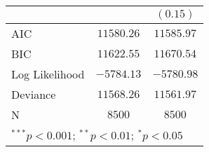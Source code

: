 \documentclass[12pt,letterpaper]{article}
\begin{document}
\begin{enumerate}
\begin{table}[h!]
\begin{adjustbox}{width=.65\textwidth}
\begin{tabular}{l c c}
			&               & $(0.15)$      \\
			\hline
			AIC                               & $11580.26$    & $11585.97$    \\
			BIC                               & $11622.55$    & $11670.54$    \\
			Log Likelihood                    & $-5784.13$    & $-5780.98$    \\
			Deviance                          & $11568.26$    & $11561.97$    \\
			N                        & $8500$        & $8500$        \\
			\hline
			\multicolumn{3}{l}{\scriptsize{$^{***}p<0.001$; $^{**}p<0.01$; $^{*}p<0.05$}}
		\end{tabular}
	\end{adjustbox}
	
\end{table}
\end{enumerate}
\end{document}
